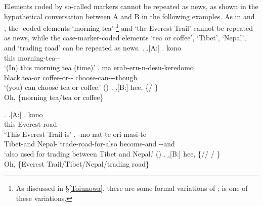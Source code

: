 Elements coded by so-called  markers cannot be repeated as news, as shown in the hypothetical conversation between A and B in the following examples.
%
%		
As in \Next and \NNext,
the -coded elements
 `morning tea'%
	\footnote{
	As discussed in \S \ref{Toiunowa},
	there are some formal variations of ;
	 is one of these variations.
	}
and  `the Everest Trail'
cannot be repeated as news,
while the case-marker-coded elements  `tea or coffee',  `Tibet',  `Nepal', and  `trading road'
can be repeated as news.
%
	\ex. \a.[A:] \ag. kono  \\
			this morning-tea-- \\
			`(In) this morning tea (time)'
		\bg. ma   erab-eru-n-desu-keredomo \\
			 black.tea-or coffee-or-- choose-can---though \\
			`(you) can choose tea or coffee.'
			 \hfill{()}
		\z.	
	\b.[B:] hee, \{/ \}\\
			Oh, \{morning tea/tea or coffee\}
	

%
	\ex. \a.[A:] \ag. kono  \\
			this Everest-road-- \\
			`This Everest Trail is'
		\bg.   -mo nat-te ori-masi-te \\
			Tibet-and Nepal- trade-road-for-also  become-and \ab{plt}--and \\
			`also used for trading between Tibet and Nepal.'
			 \hfill{()}
		\z.
	\b.[B:] hee, \{// / \}\\
			Oh, \{Everest Trail/Tibet/Nepal/trading road\}
	

